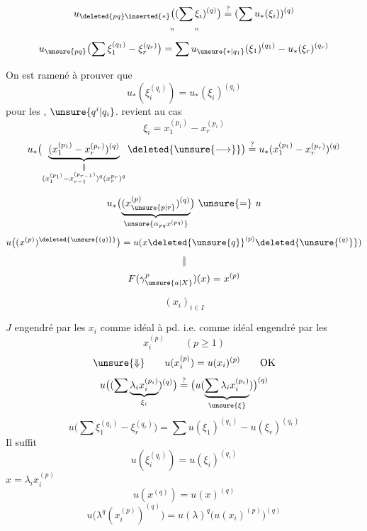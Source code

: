
\[
u_{\deleted{pq}\inserted{*}}\bigl((\sum\xi_i)^{(q)}\bigr)
\overset{?}{=}(\sum u_*(\xi_i))^{(q)}
\]
\[\text{''}\qquad\text{''}\]
\[
u_{\unsure{pq}}\bigl(\sum\xi_1^{(q_1)}-\xi_r^{(q_r)}\bigr)
=\sum u_{\unsure{*|q_1}}(\xi_1)^{(q_1)}-u_*(\xi_r)^{(q_r)}
\]

On est ramené à prouver que
\[
u_*(\xi_i^{(q_i)})=u_*(\xi_i)^{(q_i)}
\]
pour les ,  $\unsure{q^i|q_i}$.
 revient au cas
\[
\xi_i=x_1^{(p_1)}-x_r^{(p_r)}
\]
\[
u_*\bigl(\underbrace{(x_1^{(p_1)}-x_r^{(p_r)})^{(q)}}_{\substack{\Vert\\(x_1^{(p_1)}-x_{r-1}^{(p_{r-1})})^q(x_r^{p_r})^q}}\deleted{\unsure{\longrightarrow}}\bigr)
\overset{?}{=}u_*(x_1^{(p_1)}-x_r^{(p_r)})^{(q)}
\]

\[
u_*\bigl(\underbrace{(x_{\unsure{p|r}}^{(p)})^{(q)}}_{\unsure{\alpha_{pq}x^{(pq)}}}\bigr)\ \unsure{=}\ u
\]
\[
u\bigl((x^{(p)})^{\deleted{\unsure{(q)}}}\bigr)
=u(x\deleted{\unsure{q}}^{(p)}\deleted{\unsure{^{(q)}}})
\]
\[\Vert\]
\[
F(\gamma_{\unsure{a|X}}^p)(x)=x^{(p)}
\]

\[(x_i)_{i\in I}\]

$J$ engendré par les $x_i$ comme idéal à pd.
i.e. comme idéal engendré par les
\[
x_i^{(p)}\qquad(p\geq1)
\]
\[
\unsure{\Downarrow}\qquad u(x_i^{(p)})=u(x_i)^{(p)}\qquad\mathrm{OK}
\]
\[
u\bigl((\sum\underbrace{\lambda_i x_i^{(p_i)}}_{\xi_i})^{(q)}\bigr)
\overset{?}{=}\bigl(u(\underbrace{\sum\lambda_i x_i^{(p_i)}}_{\unsure{\xi}})\bigr)^{(q)}
\]
\[
u\bigl(\sum\xi_1^{(q_1)}-\xi_r^{(q_r)}\bigr)
=\sum u(\xi_1)^{(q_1)}-u(\xi_r)^{(q_r)}
\]
Il suffit
\[
u(\xi_i^{(q_i)})=u(\xi_i)^{(q_i)}
\]
\quad $x=\lambda_i x_i^{(p)}$
\[
u(x^{(q)})=u(x)^{(q)}
\]
\[
u\bigl(\lambda^q(x_i^{(p)})^{(q)}\bigr)
=u(\lambda)^q\bigl(u(x_i)^{(p)}\bigr)^{(q)}
\]

